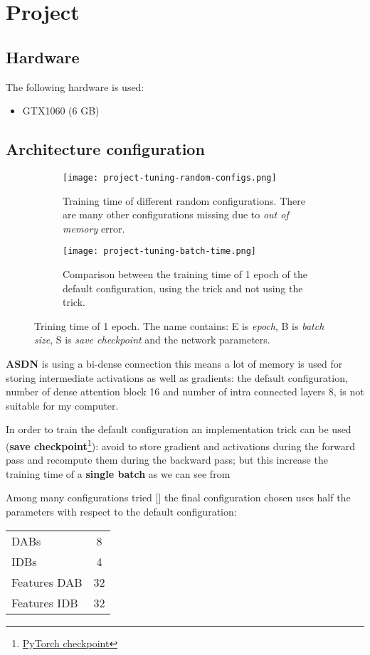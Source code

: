 \section{Project}

\subsection{Hardware}
The following hardware is used:
\begin{itemize}
    \item GTX1060 (6 GB)
\end{itemize}

\subsection{Architecture configuration}
\begin{figure}
    \begin{subfigure}{\textwidth}
        \centering
        \texttt{[image: project-tuning-random-configs.png]}
        \caption{Training time of different random configurations. There are many other configurations missing due to \textit{out of memory} error.}\label{project:random-configurations}
    \end{subfigure}
    \begin{subfigure}{\textwidth}
        \centering
        \texttt{[image: project-tuning-batch-time.png]}        
        \caption{Comparison between the training time of 1 epoch of the default configuration, using the trick and not using the trick.}\label{project:batch-time}
    \end{subfigure}

    \caption{Trining time of 1 epoch. The name contains: E is \textit{epoch}, B is \textit{batch size}, S is \textit{save checkpoint} and the network parameters.}    
\end{figure}

\textbf{ASDN} is using a bi-dense connection this means a lot of memory is used for storing intermediate activations as well as gradients: the default configuration, number of dense attention block 16 and number of intra connected layers 8, is not suitable for my computer.

In order to train the default configuration an implementation trick can be used (\textbf{save checkpoint}\footnote{\href{https://pytorch.org/docs/stable/checkpoint.html}{PyTorch checkpoint}}): avoid to store gradient and activations during the forward pass and recompute them during the backward pass; but this increase the training time of a \textbf{single batch} as we can see from 

Among many configurations tried [] the final configuration chosen uses half the parameters with respect to the default configuration:
\begin{tabular}{lc}
    DABs & 8\\
    IDBs & 4\\
    Features DAB & 32 \\
    Features IDB & 32 
\end{tabular}